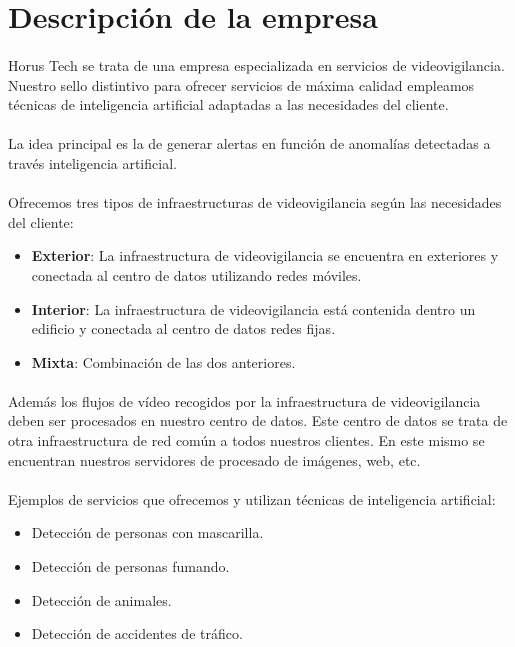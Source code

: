\section{Descripción de la empresa}
\paragraph{}
Horus Tech se trata de una empresa especializada en servicios de videovigilancia. Nuestro sello distintivo para ofrecer servicios de máxima calidad empleamos técnicas de inteligencia artificial adaptadas a las necesidades del cliente.
\paragraph{}
La idea principal es la de generar alertas en función de anomalías detectadas a través inteligencia artificial.
\paragraph{}
Ofrecemos tres tipos de infraestructuras de videovigilancia según las necesidades del cliente:
\begin{itemize}
	\item \textbf{Exterior}: La infraestructura de videovigilancia se encuentra en exteriores y conectada al centro de datos utilizando redes móviles.
	\item \textbf{Interior}: La infraestructura de videovigilancia está contenida dentro un edificio y conectada al centro de datos redes fijas.
	\item  \textbf{Mixta}: Combinación de las dos anteriores.
\end{itemize}
\paragraph{}
Además los flujos de vídeo recogidos por la infraestructura de videovigilancia deben ser procesados en nuestro centro de datos. Este centro de datos se trata de otra infraestructura de red común a todos nuestros clientes. En este mismo se encuentran nuestros servidores de procesado de imágenes, web, etc.
\paragraph{}
Ejemplos de servicios que ofrecemos y utilizan técnicas de inteligencia artificial:
\begin{itemize}
	\item Detección de personas con mascarilla.
	\item Detección de personas fumando.
	\item Detección de animales.
	\item Detección de accidentes de tráfico.
\end{itemize}